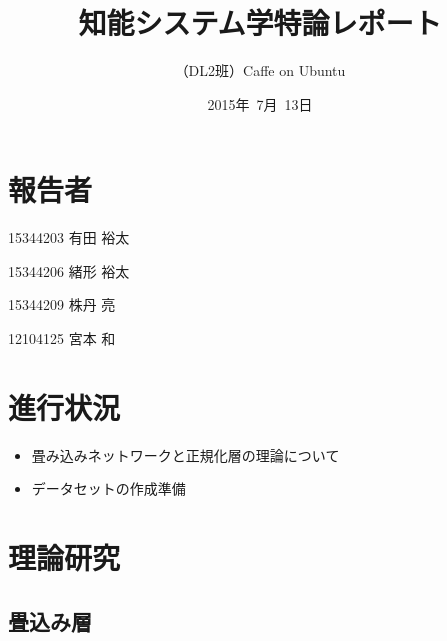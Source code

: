 \documentclass[a4paper,10pt]{jsarticle}
\title{知能システム学特論レポート}
\author{
（DL2班）Caffe on Ubuntu\\
}
\date{2015年\ 7月\ 13日}
\begin{document}
\maketitle
\section{報告者}
\begin{list}{}{}
 \item 15344203\hspace{0.5cm} 有田 裕太
 \item 15344206\hspace{0.5cm} 緒形 裕太
 \item 15344209\hspace{0.5cm} 株丹 亮
 \item 12104125\hspace{0.5cm} 宮本 和
\end{list}

\section{進行状況}

\begin{itemize}
\item 畳み込みネットワークと正規化層の理論について
\item データセットの作成準備
\end{itemize}

\section{理論研究}

\subsection{畳込み層}


\end{document}
